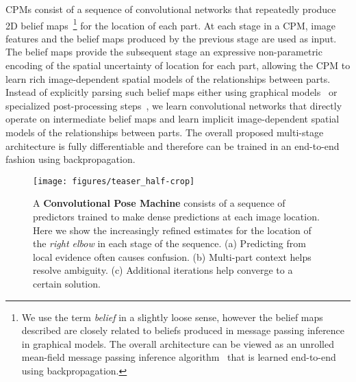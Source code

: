 \documentclass[10pt,twocolumn,letterpaper]{article}
\begin{document}
CPMs consist of a sequence of convolutional networks that repeatedly produce 2D belief maps~\footnote{We use the term \emph{belief} in a slightly loose sense, however the belief maps described are closely related to beliefs produced in message passing inference in graphical models. The overall architecture can be viewed as an unrolled mean-field message passing inference algorithm~\cite{ross2011} that is learned end-to-end using backpropagation.} 
for the location of each part. At each stage in a CPM, image features and the belief maps produced by the previous stage are used as input. The belief maps provide the subsequent stage an expressive non-parametric encoding of the spatial uncertainty of location for each part, allowing the CPM to learn rich image-dependent spatial models of the relationships between parts. Instead of explicitly parsing such belief maps either using graphical models~\cite{tompson2014joint,tompson2015cvpr,pishchulin2015deepcut} or specialized post-processing steps~\cite{toshev2013deeppose,tompson2015cvpr}, we learn convolutional networks that directly operate on intermediate belief maps and learn implicit image-dependent spatial models of the relationships between parts. The overall proposed multi-stage architecture is fully differentiable and therefore can be trained in an end-to-end fashion using backpropagation.

\begin{figure}[t!]
    \centering
    \texttt{[image: figures/teaser\_half-crop]}
    \caption{A \textbf{Convolutional Pose Machine} consists of a sequence of predictors trained to make dense predictions at each image location. Here we show the increasingly refined estimates for the location of the \emph{right elbow} in each stage of the sequence.
(a) Predicting from local evidence often causes confusion. (b) Multi-part context helps resolve ambiguity. (c) Additional iterations help converge to a certain solution.}
    \label{fig:teaser}
\end{figure}
\end{document}

